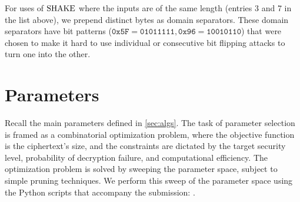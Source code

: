 \documentclass{iacrcc}
\newif\ifshoworiginal
\begin{document}
For uses of $\textrm{\upshape\mdseries SHAKE}$ where the inputs are of the same length (entries 3 and 7 in the list above), we prepend distinct bytes as domain separators.  These domain separators have bit patterns ($\mathtt{0x5F}=\mathtt{01011111}, \mathtt{0x96}=\mathtt{10010110}$) that were chosen to make it hard to use individual or consecutive bit flipping attacks to turn one into the other.

\section{Parameters}\label{sec:params}

\ifshoworiginal
This section outlines our methodology for choosing tunable parameters of the proposed algorithms. 

\subsection{High-level overview}

Recall the main $\FrodoPKE$ parameters defined in
\autoref{sec:algs}:
\begin{itemize}
  \item $\chi$, a probability distribution on $\bbZ$;
  \item $q=2^D$, a power-of-two integer modulus with exponent $D \leq 16$;
  \item $n,\mbar,\nbar$, integer matrix dimensions with $n \equiv 0 \pmod 8$;
  \item $B\leq D$, the number of bits encoded in each matrix entry;
  \item $\ell=B\cdot \mbar\cdot\nbar$ the length of bit strings to be encoded in an $\mbar$-by-$\nbar$ matrix.
\end{itemize}

The task of parameter selection is framed as a combinatorial
optimization problem, where the objective function is the ciphertext's
size, and the constraints are dictated by the target security level,
probability of decryption failure, and computational efficiency. The
optimization problem is solved by sweeping the parameter space,
subject to simple pruning techniques.  We perform this sweep of the
parameter space using the Python scripts that accompany the
submission, in the folder
\texttt{Additional\_Implementations/Parameter\_Search\_Scripts}.

\else

Recall the main \FrodoPKE parameters defined in \autoref{sec:algs}.
The task of parameter selection is framed as a combinatorial
optimization problem, where the objective function is the ciphertext's
size, and the constraints are dictated by the target security level,
probability of decryption failure, and computational efficiency. The
optimization problem is solved by sweeping the parameter space,
subject to simple pruning techniques.  We perform this sweep of the
parameter space using the Python scripts that accompany the
submission: .
\fi
\end{document}
